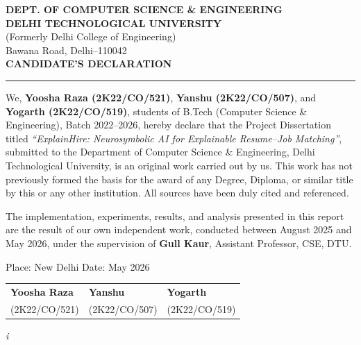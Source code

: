 \documentclass[12pt,a4paper]{report}
\begin{document}
\newpage
\pagestyle{plain}
\setcounter{page}{1}
\thispagestyle{plain}

\begin{center}
\textbf{\large DEPT. OF COMPUTER SCIENCE \& ENGINEERING}\\
\textbf{\large DELHI TECHNOLOGICAL UNIVERSITY}\\
{\small (Formerly Delhi College of Engineering)}\\
{\small Bawana Road, Delhi--110042}\\[20pt]
\textbf{\Large CANDIDATE'S DECLARATION}\\[4pt]
\rule{0.5\linewidth}{0.4pt}
\end{center}

\vspace{14pt}

We, \textbf{Yoosha Raza (2K22/CO/521)}, \textbf{Yanshu (2K22/CO/507)}, and \textbf{Yogarth (2K22/CO/519)}, students of B.Tech (Computer Science \& Engineering), Batch 2022--2026, hereby declare that the Project Dissertation titled \textit{``ExplainHire: Neurosymbolic AI for Explainable Resume--Job Matching''}, submitted to the Department of Computer Science \& Engineering, Delhi Technological University, is an original work carried out by us. This work has not previously formed the basis for the award of any Degree, Diploma, or similar title by this or any other institution. All sources have been duly cited and referenced.

The implementation, experiments, results, and analysis presented in this report are the result of our own independent work, conducted between August 2025 and May 2026, under the supervision of \textbf{Gull Kaur}, Assistant Professor, CSE, DTU.

\vspace{24pt}
\noindent Place: New Delhi \hfill Date: May 2026

\vspace{36pt}
\begin{tabular}{p{4cm} p{4cm} p{4cm}}
\textbf{Yoosha Raza} & \textbf{Yanshu} & \textbf{Yogarth} \\
(2K22/CO/521) & (2K22/CO/507) & (2K22/CO/519) \\
\end{tabular}

\vspace*{\fill}
\begin{center}{\small \textit{i}}\end{center}
\end{document}
